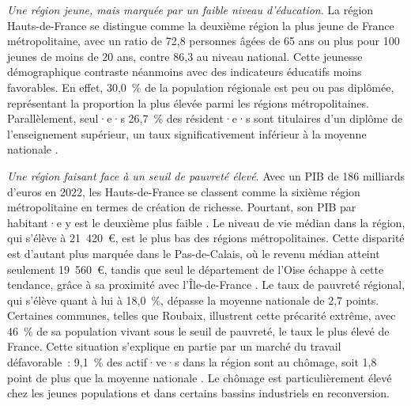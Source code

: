 \begin{refsegment}
\textsl{Une région jeune, mais marquée par un faible niveau d'éducation}. La région Hauts-de-France se distingue comme la deuxième région la plus jeune de France métropolitaine, avec un ratio de 72,8 personnes âgées de 65 ans ou plus pour 100 jeunes de moins de 20 ans, contre 86,3 au niveau national. Cette jeunesse démographique contraste néanmoins avec des indicateurs éducatifs moins favorables. En effet, 30,0~\% de la population régionale est peu ou pas diplômée, représentant la proportion la plus élevée parmi les régions métropolitaines. Parallèlement, seul·e·s 26,7~\% des résident·e·s sont titulaires d’un diplôme de l’enseignement supérieur, un taux significativement inférieur à la moyenne nationale \textcolor{blue}{\autocite{insee_essentiel_2024}}.%

\textsl{Une région faisant face à un seuil de pauvreté élevé}. Avec un \acrfull{PIB} de 186 milliards d’euros en 2022, les Hauts-de-France se classent comme la sixième région métropolitaine en termes de création de richesse. Pourtant, son \acrshort{PIB} par habitant·e y est le deuxième plus faible \textcolor{blue}{\autocite{insee_essentiel_2024}}. Le niveau de vie médian dans la région, qui s'élève à 21~420~\euro, est le plus bas des régions métropolitaines. Cette disparité est d'autant plus marquée dans le Pas-de-Calais, où le revenu médian atteint seulement 19~560~\euro, tandis que seul le département de l'Oise échappe à cette tendance, grâce à sa proximité avec l'Île-de-France \textcolor{blue}{\autocite{ministere_de_la_culture_atlas_2023}}. Le taux de pauvreté régional, qui s'élève quant à lui à 18,0~\%, dépasse la moyenne nationale de 2,7 points. Certaines communes, telles que Roubaix, illustrent cette précarité extrême, avec 46~\% de sa population vivant sous le seuil de pauvreté, le taux le plus élevé de France. Cette situation s’explique en partie par un marché du travail défavorable~: 9,1~\% des actif·ve·s dans la région sont au chômage, soit 1,8 point de plus que la moyenne nationale \textcolor{blue}{\autocite{insee_essentiel_2024}}. Le chômage est particulièrement élevé chez les jeunes populations et dans certains bassins industriels en reconversion.%


\end{refsegment}
